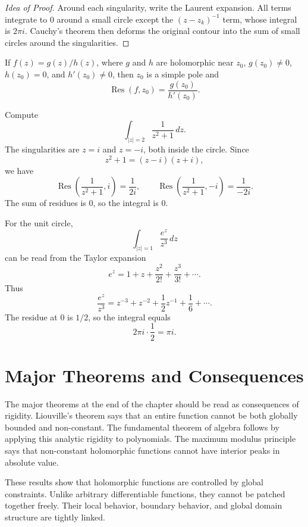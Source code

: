 \begin{proof}[Idea of Proof]
Around each singularity, write the Laurent expansion. All terms integrate to $0$ around a small circle except the $(z-z_k)^{-1}$ term, whose integral is $2\pi i$. Cauchy's theorem then deforms the original contour into the sum of small circles around the singularities.
\end{proof}

\begin{proposition}
If $f(z)=g(z)/h(z)$, where $g$ and $h$ are holomorphic near $z_0$, $g(z_0)\neq 0$, $h(z_0)=0$, and $h'(z_0)\neq 0$, then $z_0$ is a simple pole and
\[
    \operatorname{Res}(f,z_0)=\frac{g(z_0)}{h'(z_0)}.
\]
\end{proposition}

\begin{example}
Compute
\[
    \int_{|z|=2}\frac{1}{z^2+1}\,dz.
\]
The singularities are $z=i$ and $z=-i$, both inside the circle. Since
\[
    z^2+1=(z-i)(z+i),
\]
we have
\[
    \operatorname{Res}\left(\frac{1}{z^2+1},i\right)=\frac{1}{2i},
    \qquad
    \operatorname{Res}\left(\frac{1}{z^2+1},-i\right)=\frac{1}{-2i}.
\]
The sum of residues is $0$, so the integral is $0$.
\end{example}

\newpage

\begin{example}
For the unit circle,
\[
    \int_{|z|=1}\frac{e^z}{z^3}\,dz
\]
can be read from the Taylor expansion
\[
    e^z=1+z+\frac{z^2}{2!}+\frac{z^3}{3!}+\cdots.
\]
Thus
\[
    \frac{e^z}{z^3}=z^{-3}+z^{-2}+\frac{1}{2}z^{-1}+\frac{1}{6}+\cdots.
\]
The residue at $0$ is $1/2$, so the integral equals
\[
    2\pi i\cdot\frac{1}{2}=\pi i.
\]
\end{example}

\section{Major Theorems and Consequences}


The major theorems at the end of the chapter should be read as consequences of rigidity. Liouville's theorem says that an entire function cannot be both globally bounded and non-constant. The fundamental theorem of algebra follows by applying this analytic rigidity to polynomials. The maximum modulus principle says that non-constant holomorphic functions cannot have interior peaks in absolute value.

These results show that holomorphic functions are controlled by global constraints. Unlike arbitrary differentiable functions, they cannot be patched together freely. Their local behavior, boundary behavior, and global domain structure are tightly linked.

